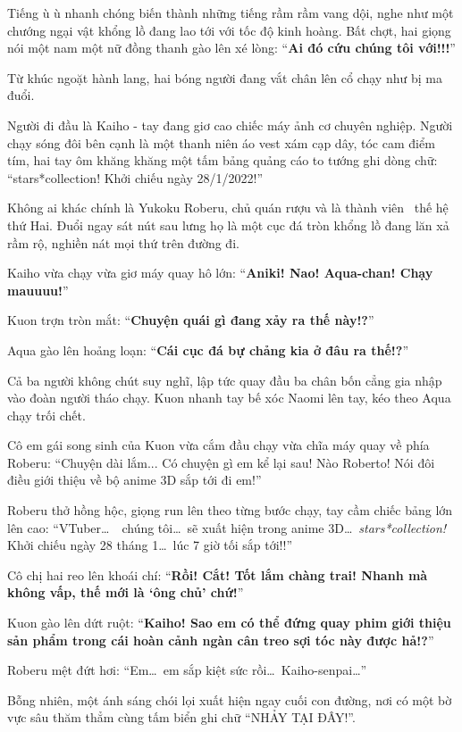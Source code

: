 \documentclass[../main.tex]{subfiles}
\begin{document}
Tiếng ù ù nhanh chóng biến thành những tiếng rầm rầm vang dội, nghe như một chướng ngại vật khổng lồ đang lao tới với tốc độ kinh hoàng. Bất chợt, hai giọng nói một nam một nữ đồng thanh gào lên xé lòng: ``\textbf{Ai đó cứu chúng tôi với!!!}''

Từ khúc ngoặt hành lang, hai bóng người đang vắt chân lên cổ chạy như bị ma đuổi.

Người đi đầu là Kaiho - tay đang giơ cao chiếc máy ảnh cơ chuyên nghiệp. Người chạy sóng đôi bên cạnh là một thanh niên áo vest xám cạp dây, tóc cam điểm tím, hai tay ôm khăng khăng một tấm bảng quảng cáo to tướng ghi dòng chữ: ``stars*collection! Khởi chiếu ngày 28/1/2022!''


Không ai khác chính là Yukoku Roberu, chủ quán rượu và là thành viên \hls\ thế hệ thứ Hai. Đuổi ngay sát nút sau lưng họ là một cục đá tròn khổng lồ đang lăn xả rầm rộ, nghiền nát mọi thứ trên đường đi.

Kaiho vừa chạy vừa giơ máy quay hô lớn: ``\textbf{Aniki! Nao! Aqua-chan! Chạy mauuuu!}''

Kuon trợn tròn mắt: ``\textbf{Chuyện quái gì đang xảy ra thế này!?}''

Aqua gào lên hoảng loạn: ``\textbf{Cái cục đá bự chảng kia ở đâu ra thế!?}''

Cả ba người không chút suy nghĩ, lập tức quay đầu ba chân bốn cẳng gia nhập vào đoàn người tháo chạy. Kuon nhanh tay bế xóc Naomi lên tay, kéo theo Aqua chạy trối chết.

Cô em gái song sinh của Kuon vừa cắm đầu chạy vừa chĩa máy quay về phía Roberu: ``Chuyện dài lắm... Có chuyện gì em kể lại sau! Nào Roberto! Nói đôi điều giới thiệu về bộ anime 3D sắp tới đi em!''

Roberu thở hồng hộc, giọng run lên theo từng bước chạy, tay cầm chiếc bảng lớn lên cao: ``VTuber\dots\ \hls\ chúng tôi\dots\ sẽ xuất hiện trong anime 3D\dots\ \textit{stars*collection!} Khởi chiếu ngày 28 tháng 1\dots\ lúc 7 giờ tối sắp tới!!''

Cô chị hai reo lên khoái chí: ``\textbf{Rồi! Cắt! Tốt lắm chàng trai! Nhanh mà không vấp, thế mới là `ông chủ' chứ!}''

Kuon gào lên dứt ruột: ``\textbf{Kaiho! Sao em có thể đứng quay phim giới thiệu sản phẩm trong cái hoàn cảnh ngàn cân treo sợi tóc này được hả!?}''

Roberu mệt đứt hơi: ``Em\dots\ em sắp kiệt sức rồi\dots\ Kaiho-senpai\dots''

Bỗng nhiên, một ánh sáng chói lọi xuất hiện ngay cuối con đường, nơi có một bờ vực sâu thăm thẳm cùng tấm biển ghi chữ ``NHẢY TẠI ĐÂY!''.
\end{document}
